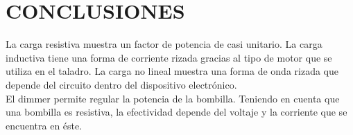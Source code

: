\documentclass[journal]{IEEEtran}
\begin{document}
\section{CONCLUSIONES}







La carga resistiva muestra un factor de potencia de 
casi unitario. La carga inductiva tiene una forma de 
corriente rizada gracias al tipo de motor que se 
utiliza en el taladro. La carga no lineal muestra 
una forma de onda rizada que depende del circuito 
dentro del dispositivo electrónico. \\

El dimmer permite regular la potencia de la bombilla. 
Teniendo en cuenta que una bombilla es resistiva, la 
efectividad depende del voltaje y la corriente que se 
encuentra en éste. \\
\end{document}
